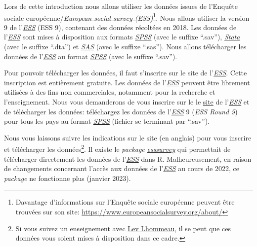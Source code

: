 \documentclass[
]{book}
\begin{document}
Lors de cette introduction nous allons utiliser les données issues de l'Enquête sociale européenne/\href{https://www.europeansocialsurvey.org/}{\emph{European social survey (ESS)}}\footnote{Davantage d'informations sur l'Enquête sociale européenne peuvent être trouvées sur son site: \url{https://www.europeansocialsurvey.org/about/}}. Nous allons utiliser la version 9 de l'\href{https://www.europeansocialsurvey.org/}{\emph{ESS}} (ESS 9), contenant des données récoltées en 2018. Les données de l'\href{https://www.europeansocialsurvey.org/}{\emph{ESS}} sont mises à disposition aux formats \href{https://www.ibm.com/fr-fr/products/spss-statistics}{\emph{SPSS}} (avec le suffixe ``.sav''), \href{https://www.stata.com/}{\emph{Stata}} (avec le suffixe ``.dta'') et \href{https://www.sas.com/}{\emph{SAS}} (avec le suffixe ``.sas''). Nous allons télécharger les données de l'\href{https://www.europeansocialsurvey.org/}{\emph{ESS}} au format \href{https://www.ibm.com/fr-fr/products/spss-statistics}{\emph{SPSS}} (avec le suffixe ``.sav'').

Pour pouvoir télécharger les données, il faut s'inscrire sur le site de l'\href{https://www.europeansocialsurvey.org/}{\emph{ESS}}. Cette inscription est entièrement gratuite. Les données de l'\href{https://www.europeansocialsurvey.org/}{\emph{ESS}} peuvent être librement utilisées à des fins non commerciales, notamment pour la recherche et l'enseignement. Nous vous demanderons de vous inscrire sur le le \href{https://www.europeansocialsurvey.org/}{site} de l'\href{https://www.europeansocialsurvey.org/}{\emph{ESS}} et de télécharger les données: téléchargez les données de l'\href{https://www.europeansocialsurvey.org/}{\emph{ESS}} 9 (\emph{ESS Round 9}) pour tous les pays au format \href{https://www.ibm.com/fr-fr/products/spss-statistics}{\emph{SPSS}} (fichier se terminant par ``.sav'').

Nous vous laissons suivre les indications sur le site (en anglais) pour vous inscrire et télécharger les données\footnote{Si vous suivez un enseignement avec \href{mailto:lhommeau@gmail.com}{Lev Lhommeau}, il se peut que ces données vous soient mises à disposition dans ce cadre.}. Il existe le \emph{package} \href{https://cran.r-project.org/web/packages/essurvey/vignettes/intro_ess.html}{\emph{esssurvey}} qui permettait de télécharger directement les données de l'\href{https://www.europeansocialsurvey.org/}{\emph{ESS}} dans R. Malheureusement, en raison de changements concernant l'accès aux données de l'\href{https://www.europeansocialsurvey.org/}{\emph{ESS}} au cours de 2022, ce \emph{package} ne fonctionne plus (janvier 2023).
\end{document}

